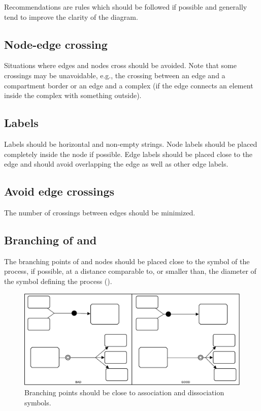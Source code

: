 Recommendations are rules which should be followed if possible and generally tend to improve the clarity of the diagram.

\subsection{Node-edge crossing}
\label{sec:crosEdNo}

Situations where edges and nodes cross should be avoided. Note that some crossings may be unavoidable, e.g., the crossing between an edge and a compartment border or an edge and a complex (if the edge connects an element inside the complex with something outside).

\subsection{Labels}
\label{sec:labels}

Labels should be horizontal and non-empty strings. Node labels should be placed completely
inside the node if possible. Edge labels should be placed close to the edge and should avoid overlapping the edge as well as other edge
labels.

\subsection{Avoid edge crossings}

The number of crossings between edges should be minimized.

\subsection{Branching of  and }

The branching points of  and  nodes should be placed close to the symbol of the process, if possible, at a distance comparable to, or smaller than, the diameter of the symbol defining the process ().

\begin{figure}[htb]
  \centering
  \includegraphics[scale=0.5]{images/build/layout_branching.pdf}
  \caption{Branching points should be close to association and dissociation symbols.}\label{fig:branching}
\end{figure}

